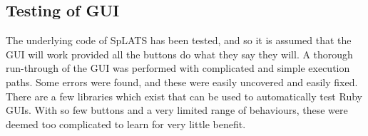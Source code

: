 \subsection{Testing of GUI}
The underlying code of SpLATS has been tested, and so it is assumed that the GUI will work provided all the buttons do what they say they will.
A thorough run-through of the GUI was performed with complicated and simple execution paths. Some errors were found, and these were easily uncovered and easily fixed.
There are a few libraries which exist that can be used to automatically test Ruby GUIs.
With so few buttons and a very limited range of behaviours, these were deemed too complicated to learn for very little benefit.
